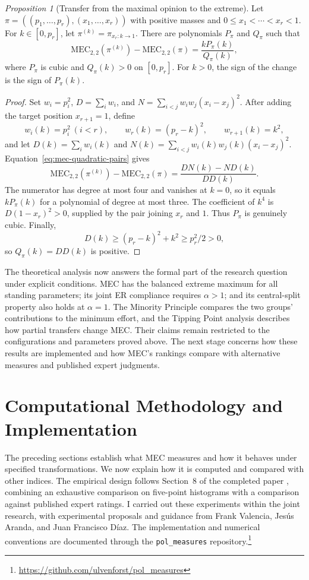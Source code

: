 \documentclass{article}
\theoremstyle{plain}
\theoremstyle{remark}
\newtheorem{proposition}{Proposition}
\begin{document}
\begin{proposition}[Transfer from the maximal opinion to the extreme]\label{prop:mec-general-transfer}
Let $\pi=((p_1,\ldots,p_r),(x_1,\ldots,x_r))$ with positive masses and $0\leq x_1<\cdots<x_r<1$. For $k\in[0,p_r]$, let $\pi^{(k)}=\pi_{x_r:k\to1}$. There are polynomials $P_\pi$ and $Q_\pi$ such that
\[
\mathrm{MEC}_{2,2}(\pi^{(k)})-\mathrm{MEC}_{2,2}(\pi)
=\frac{kP_\pi(k)}{Q_\pi(k)},
\]
where $P_\pi$ is cubic and $Q_\pi(k)>0$ on $[0,p_r]$. For $k>0$, the sign of the change is the sign of $P_\pi(k)$.
\end{proposition}
\begin{proof}
Set $w_i=p_i^2$, $D=\sum_i w_i$, and $N=\sum_{i<j}w_iw_j(x_i-x_j)^2$. After adding the target position $x_{r+1}=1$, define
\[
w_i(k)=p_i^2\ (i<r),\qquad
w_r(k)=(p_r-k)^2,\qquad w_{r+1}(k)=k^2,
\]
and let $D(k)=\sum_iw_i(k)$ and $N(k)=\sum_{i<j}w_i(k)w_j(k)(x_i-x_j)^2$. Equation~\eqref{eq:mec-quadratic-pairs} gives
\[
\mathrm{MEC}_{2,2}(\pi^{(k)})-\mathrm{MEC}_{2,2}(\pi)
=\frac{DN(k)-ND(k)}{DD(k)}.
\]
The numerator has degree at most four and vanishes at $k=0$, so it equals $kP_\pi(k)$ for a polynomial of degree at most three. The coefficient of $k^4$ is $D(1-x_r)^2>0$, supplied by the pair joining $x_r$ and $1$. Thus $P_\pi$ is genuinely cubic. Finally,
\[
D(k)\geq(p_r-k)^2+k^2\geq p_r^2/2>0,
\]
so $Q_\pi(k)=DD(k)$ is positive.
\end{proof}

The theoretical analysis now answers the formal part of the research question under explicit conditions. MEC has the balanced extreme maximum for all standing parameters; its joint ER compliance requires $\alpha>1$; and its central-split property also holds at $\alpha=1$. The Minority Principle compares the two groups' contributions to the minimum effort, and the Tipping Point analysis describes how partial transfers change MEC. Their claims remain restricted to the configurations and parameters proved above. The next stage concerns how these results are implemented and how MEC's rankings compare with alternative measures and published expert judgments.

\section{Computational Methodology and Implementation}\label{sec:methods}

The preceding sections establish what MEC measures and how it behaves under specified transformations. We now explain how it is computed and compared with other indices. The empirical design follows Section~8 of the completed paper \citep{aranda2026mec}, combining an exhaustive comparison on five-point histograms with a comparison against published expert ratings. I carried out these experiments within the joint research, with experimental proposals and guidance from Frank Valencia, Jesús Aranda, and Juan Francisco Díaz. The implementation and numerical conventions are documented through the \texttt{pol\_measures} repository.\footnote{\url{https://github.com/ulvenforst/pol_measures}}
\end{document}
